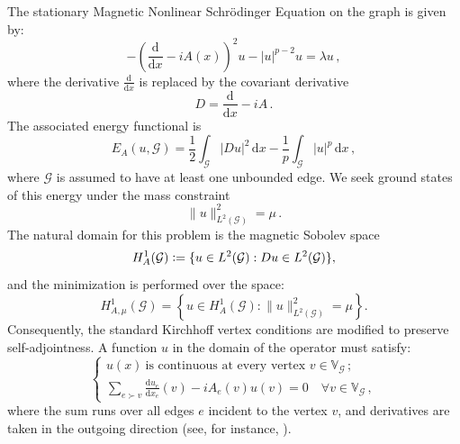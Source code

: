 \documentclass[12pt,a4paper]{amsart}
\theoremstyle{definition}
\theoremstyle{plain}
\def \G {\mathcal{G}}
\newcommand{\defeq}{\vcentcolon=}
\numberwithin{equation}{section}
\begin{document}
The stationary Magnetic Nonlinear Schrödinger Equation on the graph is given by:
\begin{equation}
    - \left( \frac{\textrm{d}}{\textrm{d}x} - i A(x) \right)^2 u  - |u|^{p-2}u = \lambda u\,,
\end{equation}
where the derivative $\frac{\textrm{d}}{\textrm{d}x}$ is replaced by the covariant derivative
\begin{equation}
    D=\frac{\textrm{d}}{\textrm{d}x}-iA\,.
\end{equation}
The associated energy functional is
\begin{equation} \label{functional}
    E_A(u, \G) = \frac{1}{2}\int_{\mathcal{G}} |Du|^2 \, \textrm{d}x - \frac{1}{p}\int_{\G} |u|^p \, \textrm{d}x\,,
\end{equation}
where $\G$ is assumed to have at least one unbounded edge. 
We seek ground states of this energy under the mass constraint
\begin{equation}
    \|u\|^2_{L^2(\G)} = \mu\,.
\end{equation}
The natural domain for this problem is the magnetic Sobolev space 
$$
H^1_A(\G) \defeq \{ u \in L^2(\G) : Du \in L^2(\G) \},
$$
and the minimization is performed over the space:
\begin{equation}
    H^1_{A,\mu}(\G) = \left\lbrace u \in H^1_A(\G) : \|u\|^2_{L^2(\G)} = \mu \right\rbrace.
\end{equation}
Consequently, the standard Kirchhoff vertex conditions are modified to preserve self-adjointness. A function $u$ in the domain of the operator must satisfy:
\begin{equation}
    \label{bc}
    \begin{cases}
        u(x) \ \text{is continuous at every vertex } v \in \mathbb{V}_\mathcal{G}\,; \\
        \sum_{e \succ v} \frac{\textrm{d} u_e}{\textrm{d}x_e}(v) - i A_e(v) u(v) = 0 \quad \forall v \in \mathbb{V}_\mathcal{G}\,,
    \end{cases}   
\end{equation}
where the sum runs over all edges $e$ incident to the vertex $v$, and derivatives are taken in the outgoing direction (see, for instance, \cite{Berkolaiko2013}).
\end{document}
